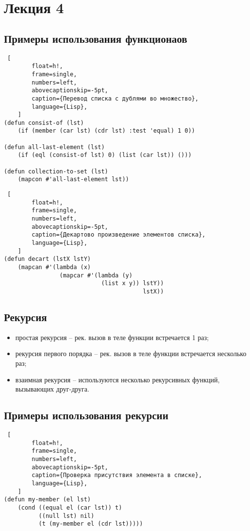\chapter{Лекция 4}

\section{Примеры использования функционаов}

\begin{lstlisting} [
		float=h!,
		frame=single,
		numbers=left,
		abovecaptionskip=-5pt,
		caption={Перевод списка с дублями во множество},
		language={Lisp},
	]
(defun consist-of (lst)
    (if (member (car lst) (cdr lst) :test 'equal) 1 0))

(defun all-last-element (lst)
    (if (eql (consist-of lst) 0) (list (car lst)) ()))

(defun collection-to-set (lst)
    (mapcon #'all-last-element lst))
\end{lstlisting}

\begin{lstlisting} [
		float=h!,
		frame=single,
		numbers=left,
		abovecaptionskip=-5pt,
		caption={Декартово произведение элементов списка},
		language={Lisp},
	]
(defun decart (lstX lstY)
    (mapcan #'(lambda (x)
                (mapcar #'(lambda (y)
                            (list x y)) lstY))
                                        lstX))
\end{lstlisting}

\section{Рекурсия}

\begin{itemize}
    \item простая рекурсия -- рек. вызов в теле функции встречается 1 раз;
    \item рекурсия первого порядка -- рек. вызов в теле функции встречается несколько раз;
    \item взаимная рекурсия -- используются несколько рекурсивных функций, вызывающих друг-друга.
\end{itemize}

\section{Примеры использования рекурсии}

\begin{lstlisting} [
		float=h!,
		frame=single,
		numbers=left,
		abovecaptionskip=-5pt,
		caption={Проверка присутствия элемента в списке},
		language={Lisp},
	]
(defun my-member (el lst)
    (cond ((equal el (car lst)) t)
          ((null lst) nil)
          (t (my-member el (cdr lst)))))
\end{lstlisting}

